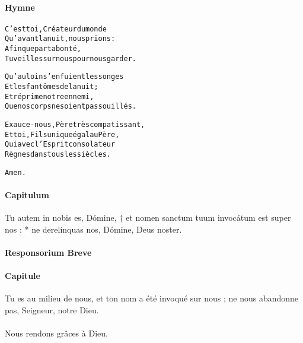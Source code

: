 \documentclass[twoside]{article}
\begin{document}
\begin{paracol}[1]{2}


\switchcolumn

\paragraph{Hymne}
\begin{alltt}\normalfont



             C'est toi, Créateur du monde
             Qu'avant la nuit, nous prions :
             Afin que par ta bonté,
             Tu veilles sur nous pour nous garder.

             Qu'au loin s'enfuient les songes
             Et les fantômes de la nuit ;
             Et réprime notre ennemi,
             Que nos corps ne soient pas souillés.

             Exauce-nous, Père très compatissant,
             Et toi, Fils unique égal au Père,
             Qui avec l'Esprit consolateur
             Règnes dans tous les siècles.
             
             Amen.
\end{alltt}

\switchcolumn*

\paragraph{Capitulum}

Tu autem in nobis es, Dómine, † et nomen sanctum tuum invocátum est super nos : * ne derelínquas nos, Dómine, Deus noster.


\pagebreak

\paragraph{Responsorium Breve}


\switchcolumn

\paragraph{Capitule}

 \capsaut Tu es au milieu de nous, et ton nom a été invoqué sur nous ; ne nous abandonne pas, Seigneur, notre Dieu.\\
~\\
\rr Nous rendons grâces à Dieu.


\end{paracol}
\end{document}
